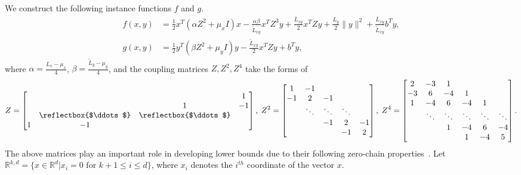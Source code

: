 \documentclass{osudissert96}
\DeclareMathOperator*{\argmin}{arg\,min}
\begin{document}
\vspace{0.1cm}
 We construct the following instance functions $f$ and $g$.
 \begin{align}\label{str_fg}
f(x,y) &= \frac{1}{2} x^T(\alpha Z^2 +\mu_x I) x -\frac{\alpha\beta}{\widetilde L_{xy}}x^TZ^3y +\frac{\bar L_{xy}}{2}x^TZy + \frac{L_y}{2}\|y\|^2 + \frac{\bar L_{xy}}{\widetilde L_{xy}} b^T y, \nonumber
\\g(x,y) &= \frac{1}{2} y^T (\beta Z^2 +\mu_y I)y -\frac{\widetilde L_{xy}}{2} x^TZy + b^Ty, 
\end{align} %
where $\alpha=\frac{L_x-\mu_x}{4}$, $\beta=\frac{\widetilde L_y-\mu_y}{4}$, and the coupling matrices  $Z,Z^2,Z^4$ take the forms of 
{\footnotesize
\begin{align}\label{matrices_coupling}
Z= \begin{bmatrix}
 &   &  & 1\\
 &  &  1& -1  \\
  &\text{\reflectbox{$\ddots$}} &\text{\reflectbox{$\ddots
  $}} &  \\
  1& -1  &  & \\ 
\end{bmatrix},\;
Z^2 =
\begin{bmatrix}
 1& -1 &  &  & \\
 -1& 2  &-1 &  & \\
 &   \ddots & \ddots & \ddots  & \\
  && -1& 2 & -1 \\
  &  & & -1 & 2\\ 
\end{bmatrix},\;
Z^4 =  
\begin{bmatrix}
 2& -3 & 1 &  & &\\
 -3& 6  &-4 &1  & &\\
 1& -4 & 6 & -4 & 1&\\
  &  \ddots&  \ddots&  \ddots &  \ddots & \ddots\\
   &  & 1& -4 &  6& -4 \\
  &  & & 1 & -4 & 5\\ 
\end{bmatrix}.
\end{align}
}
\hspace{-0.13cm}The above matrices play an important role in developing lower bounds due to their following zero-chain properties~\cite{nesterov2003introductory,zhang2019lower}. Let $\mathbb{R}^{k,d}= \{x\in\mathbb{R}^d | x_i=0 \text{ for } k+1\leq i \leq d\}$, where $x_i$ denotes the $i^{th}$ coordinate of the vector $x$. 
\end{document}

